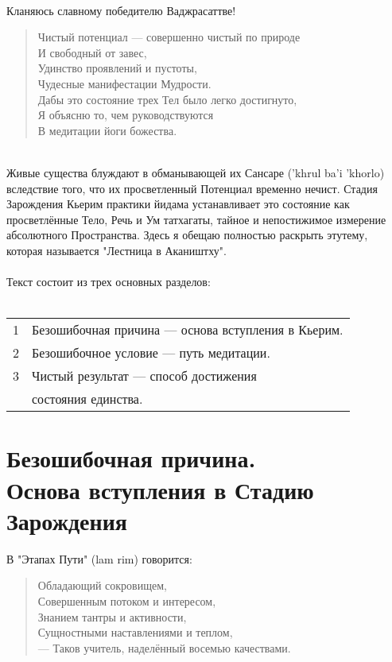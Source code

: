 \ru
\Section*{}
\\
Кланяюсь славному победителю Ваджрасаттве!

\begin{verse}
Чистый потенциал — совершенно чистый по природе\\
И свобод\-ный от завес,\\
Удинство проявлений и пустоты,\\
Чудесные мани\-фестации Мудрости.\\
Дабы это состояние трех Тел было легко достигнуто,\\
Я объясню то, чем руководствуются\\
В медитации йоги божества.\\
\end{verse}
\\
Живые существа блуждают в обманывающей их Сансаре ('khrul ba'i 'khorlo)
вследствие того, что их просветленный Потенциал временно нечист.
Стадия Зарождения Кьерим практики йидама устанавливает это
состояние как просветлённые Тело, Речь и Ум татхагаты, тайное
и непостижимое измерение абсолютного Пространства. Здесь я
обещаю полностью раскрыть этутему, которая называется
"Лестница в Акаништху".\\
\\
Текст состоит из трех основных разделов:\\
\\
\begin{tabular}{ll}
1 & Безошибочная причина — основа вступления в Кьерим.\\
2 & Безошибочное условие — путь медитации.\\
3 & Чистый результат — способ достижения \\
  & состояния единства.\\
\end{tabular}
\newpage
\section{Безошибочная причина.\\Основа вступления в Стадию Зарождения}

\vspace{1cm}
В "Этапах Пути" (lam rim) говорится:

\begin{verse}
Обладающий сокровищем,\\
Совершенным потоком и интересом,\\
Знанием тантры и активности,\\
Сущностными наставлениями и теплом,\\
— Таков учитель, наделённый восемью качествами.
\end{verse}

